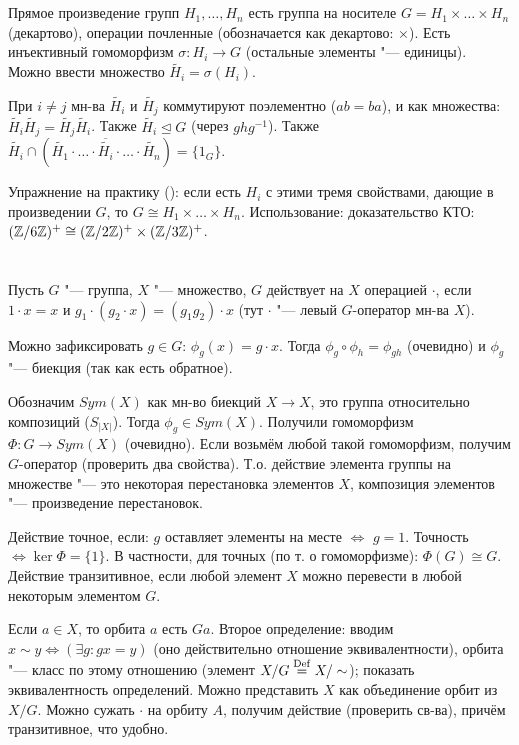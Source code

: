 \section{} %
Прямое произведение групп $H_1, \dots, H_n$ есть группа на носителе $G=H_1 \times \dots \times H_n$
(декартово), операции почленные (обозначается как декартово: $\times$).
Есть инъективный гомоморфизм $\sigma \colon H_i \to G$ (остальные элементы "--- единицы).
Можно ввести множество $\widetilde{H_i}=\sigma(H_i)$.

При $i \neq j$ мн-ва $\widetilde{H_i}$ и $\widetilde{H_j}$ коммутируют поэлементно ($ab=ba$),
и как множества: $\widetilde{H_i}\widetilde{H_j}=\widetilde{H_j}\widetilde{H_i}$.
Также $\widetilde{H_i} \unlhd G$ (через $ghg^{-1}$).
Также $\widetilde{H_i} \cap (\widetilde{H_1}\cdot \dots \cdot \overbar{\widetilde{H_i}} \cdot \dots \cdot \widetilde{H_n})=\{1_G\}$.

Упражнение на практику (\TODO): если есть $H_i$ с этими тремя свойствами, дающие в произведении
$G$, то $G \cong H_1 \times \dots \times H_n$.
Использование: доказательство КТО: $(\mathbb{Z}/6\mathbb{Z})^+ \cong (\mathbb{Z}/2\mathbb{Z})^+ \times (\mathbb{Z}/3\mathbb{Z})^+$.

\section{} %
Пусть $G$ "--- группа, $X$ "--- множество, $G$ действует на $X$ операцией $\cdot$,
если $1\cdot x = x$ и $g_1\cdot(g_2 \cdot x)=(g_1g_2)\cdot x$ (тут $\cdot$ "--- левый
$G$-оператор мн-ва $X$).

Можно зафиксировать $g\in G$: $\phi_g(x) = g \cdot x$.
Тогда $\phi_g \circ \phi_h = \phi_{gh}$ (очевидно) и $\phi_g$ "--- биекция
(так как есть обратное).

Обозначим $Sym(X)$ как мн-во биекций $X \to X$, это группа относительно композиций ($S_{|X|}$).
Тогда $\phi_g \in Sym(X)$.
Получили гомоморфизм $\Phi \colon G \to Sym(X)$ (очевидно).
Если возьмём любой такой гомоморфизм, получим $G$-оператор
(проверить два свойства).
Т.о. действие элемента группы на множестве "--- это некоторая перестановка элементов $X$,
композиция элементов "--- произведение перестановок.

Действие точное, если: $g$ оставляет элементы на месте $\iff$ $g=1$.
Точность $\iff \ker \Phi =\{1\}$.
В частности, для точных (по т. о гомоморфизме): $\Phi(G) \cong G$.
Действие транзитивное, если любой элемент $X$ можно перевести в любой некоторым элементом $G$.

Если $a \in X$, то орбита $a$ есть $Ga$.
Второе определение: вводим $x \sim y \iff (\exists g \colon gx=y)$ (оно
действительно отношение эквивалентности), орбита "--- класс по этому отношению
(элемент $X/G \stackrel{\mathrm{Def}}{=} X/\sim$); показать эквивалентность определений.
Можно представить $X$ как объединение орбит из $X/G$.
Можно сужать $\cdot$ на орбиту $A$, получим действие (проверить св-ва),
причём транзитивное, что удобно.

